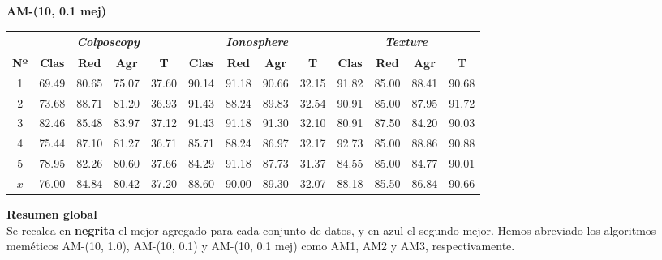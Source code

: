 \documentclass[12pt]{article}
\begin{document}
\textbf{AM-(10, 0.1 mej)}


\begin{table}[ht!]
\begin{tabular}{ccccc|cccc|cccc}
\centering
 & \multicolumn{4}{c}{\textit{Colposcopy}} & \multicolumn{4}{c}{\textit{Ionosphere}} & \multicolumn{4}{c}{\textit{Texture}} \\ \hline
\textbf{Nº} & \textbf{Clas} & \textbf{Red} & \textbf{Agr} & \textbf{T} & \textbf{Clas} & \textbf{Red} & \textbf{Agr} & \textbf{T} & \textbf{Clas} & \textbf{Red} & \textbf{Agr} & \textbf{T} \\ \hline
1 & 69.49 & 80.65 & 75.07 & 37.60 & 90.14 & 91.18 & 90.66 & 32.15 & 91.82 & 85.00 & 88.41 & 90.68 \\
2 & 73.68 & 88.71 & 81.20 & 36.93 & 91.43 & 88.24 & 89.83 & 32.54 & 90.91 & 85.00 & 87.95 & 91.72 \\
3 & 82.46 & 85.48 & 83.97 & 37.12 & 91.43 & 91.18 & 91.30 & 32.10 & 80.91 & 87.50 & 84.20 & 90.03 \\
4 & 75.44 & 87.10 & 81.27 & 36.71 & 85.71 & 88.24 & 86.97 & 32.17 & 92.73 & 85.00 & 88.86 & 90.88 \\
5 & 78.95 & 82.26 & 80.60 & 37.66 & 84.29 & 91.18 & 87.73 & 31.37 & 84.55 & 85.00 & 84.77 & 90.01 \\
\hline
$\bar{x}$ & 76.00 & 84.84 & 80.42 & 37.20 & 88.60 & 90.00 & 89.30 & 32.07 & 88.18 & 85.50 & 86.84 & 90.66 \\
\end{tabular}
\end{table}

\textbf{Resumen global}\\

Se recalca en \textbf{negrita} el mejor agregado para cada conjunto de datos, y en {\color{blue} azul} el segundo mejor. Hemos abreviado los algoritmos meméticos AM-(10, 1.0), AM-(10, 0.1) y AM-(10, 0.1 mej) como AM1, AM2 y AM3, respectivamente. 
\end{document}
